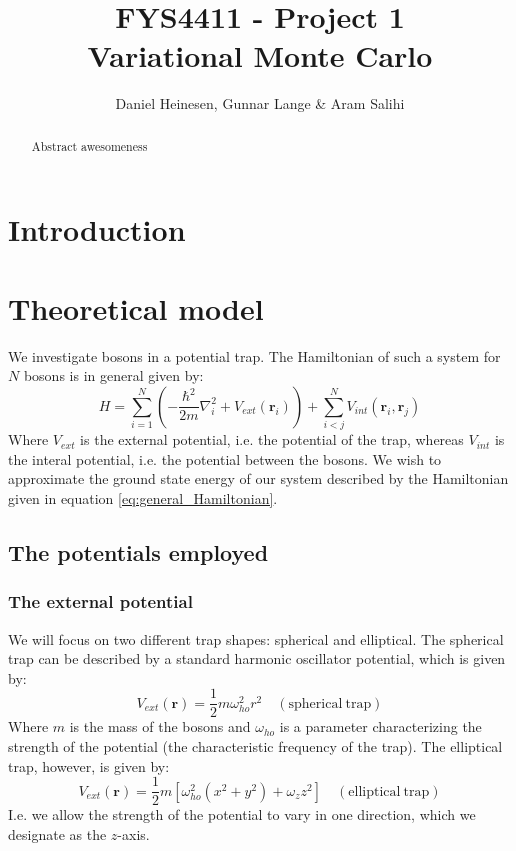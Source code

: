\documentclass[a4paper, 10pt]{article}
\title{FYS4411 - Project 1\\
Variational Monte Carlo}
\author{Daniel Heinesen, Gunnar Lange \& Aram Salihi}
\begin{document}
\maketitle
\begin{abstract}
Abstract awesomeness
\end{abstract}
\tableofcontents
\section{Introduction}
\section{Theoretical model}
We investigate bosons in a potential trap. The Hamiltonian of such a system for $N$ bosons is in general given by:
\begin{equation} \label{eq:general_Hamiltonian}
H=\sum_{i=1}^N\left(-\frac{\hbar^2}{2m}\nabla_i^2 +V_{ext}(\boldsymbol{r}_i)\right)+\sum_{i<j}^N V_{int}(\boldsymbol{r}_i, \boldsymbol{r}_j)
\end{equation}
Where $V_{ext}$ is the external potential, i.e. the potential of the trap, whereas $V_{int}$ is the interal potential, i.e. the potential between the bosons. We wish to approximate the ground state energy of our system described by the Hamiltonian given in equation \ref{eq:general_Hamiltonian}.
\subsection{The potentials employed}
\subsubsection{The external potential}
We will focus on two different trap shapes: spherical and elliptical. The spherical trap can be described by a standard harmonic oscillator potential, which is given by:
\begin{equation}
V_{ext}(\boldsymbol{r})=\frac{1}{2}m\omega_{ho}^2 r^2 \quad \mathrm{(spherical\  trap)}
\end{equation}
Where $m$ is the mass of the bosons and $\omega_{ho}$ is a parameter characterizing the strength of the potential (the characteristic frequency of the trap). The elliptical trap, however, is given by:
\begin{equation}
V_{ext}(\boldsymbol{r})=\frac{1}{2}m[\omega_{ho}^2 (x^2+y^2)+\omega_z z^2] \quad \mathrm{(elliptical\  trap)}
\end{equation}
I.e. we allow the strength of the potential to vary in one direction, which we designate as the $z$-axis.
\end{document}
